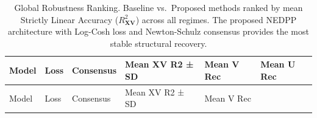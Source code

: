 \documentclass[
  letterpaper,
]{report}
\begin{document}
\begin{longtable}[]{@{}
  >{\raggedright\arraybackslash}p{}
  >{\raggedright\arraybackslash}p{}
  >{\raggedright\arraybackslash}p{}
  >{\raggedright\arraybackslash}p{}
  >{\raggedleft\arraybackslash}p{}
  >{\raggedleft\arraybackslash}p{}@{}}
\caption{Global Robustness Ranking. Baseline vs.~Proposed methods ranked
by mean Strictly Linear Accuracy (\(R^2_{\mathbf{X}\mathbf{V}}\)) across
all regimes. The proposed NEDPP architecture with Log-Cosh loss and
Newton-Schulz consensus provides the most stable structural
recovery.}\label{tbl-global-robustness}\tabularnewline
\toprule\noalign{}
\begin{minipage}[b]{\linewidth}\raggedright
Model
\end{minipage} & \begin{minipage}[b]{\linewidth}\raggedright
Loss
\end{minipage} & \begin{minipage}[b]{\linewidth}\raggedright
Consensus
\end{minipage} & \begin{minipage}[b]{\linewidth}\raggedright
Mean XV R2 ± SD
\end{minipage} & \begin{minipage}[b]{\linewidth}\raggedleft
Mean V Rec
\end{minipage} & \begin{minipage}[b]{\linewidth}\raggedleft
Mean U Rec
\end{minipage} \\
\midrule\noalign{}
\endfirsthead
\toprule\noalign{}
\begin{minipage}[b]{\linewidth}\raggedright
Model
\end{minipage} & \begin{minipage}[b]{\linewidth}\raggedright
Loss
\end{minipage} & \begin{minipage}[b]{\linewidth}\raggedright
Consensus
\end{minipage} & \begin{minipage}[b]{\linewidth}\raggedright
Mean XV R2 ± SD
\end{minipage} & \begin{minipage}[b]{\linewidth}\raggedleft
Mean V Rec
\end{minipage} & \begin{minipage}[b]{\linewidth}\raggedleft

\end{minipage}
\end{longtable}
\end{document}
